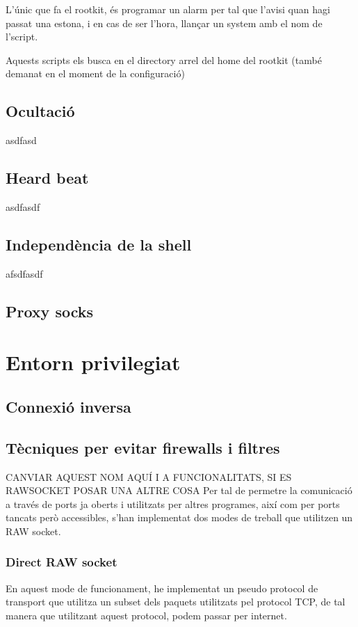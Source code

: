 L'únic que fa el rootkit, és programar un alarm per tal que l'avisi quan hagi passat una estona, i en cas de ser l'hora, llançar un system amb el nom
de l'script.

Aquests scripts els busca en el directory arrel del home del rootkit (també demanat en el moment de la configuració)

\subsection{Ocultació}
asdfasd
\subsection{Heard beat}
asdfasdf
\subsection{Independència de la shell}
afsdfasdf

\subsection{Proxy socks}

\section{Entorn privilegiat}
\subsection{Connexió inversa}
\subsection{Tècniques per evitar firewalls i filtres}
CANVIAR AQUEST NOM AQUÍ I A FUNCIONALITATS, SI ES RAWSOCKET POSAR UNA ALTRE COSA
Per tal de permetre la comunicació a través de ports ja oberts i utilitzats per altres programes, així com per ports tancats però accessibles, s'han
implementat dos modes de treball que utilitzen un RAW socket.

\subsubsection{Direct RAW socket}
En aquest mode de funcionament, he implementat un pseudo protocol de transport que utilitza un subset dels paquets utilitzats pel protocol TCP, de tal
manera que utilitzant aquest protocol, podem passar per internet. 

